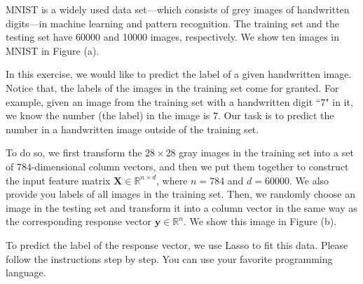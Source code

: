 \documentclass[11pt,letter,notitlepage]{article}
\begin{document}
\newpage
\begin{exercise}
    MNIST is a widely used data set---which consists of grey images of handwritten digits---in machine learning and pattern recognition. The training set and the testing set have 60000 and 10000 images, respectively. We show ten images in MNIST in Figure (a).
    
    In this exercise, we would like to predict the label of a given handwritten image. Notice that, the labels of the images in the training set come for granted. For example, given an image from the training set with a handwritten digit ``$7$" in it, we know the number (the label) in the image is $7$. Our task is to predict the number in a handwritten image outside of the training set.
    
    To do so, we first transform the $28\times28$ gray images in the training set into a set of $784$-dimensional column vectors, and then we put them together to construct the input feature matrix $\textbf{X} \in \mathbb{R}^{n\times d}$, where $n=784$ and $d=60000$. We also provide you labels of all images in the training set. Then, we randomly choose an image in the testing set and transform it into a column vector in the same way as the corresponding response vector $\textbf{y}\in \mathbb{R}^n$. We show this image in Figure (b).
    
    To predict the label of the response vector, we use Lasso to fit this data. Please follow the instructions step by step. You can use your favorite programming language.
\end{exercise}
    
 \begin{figure}[htp]
  \centering
  \hspace{1in}
  \label{fig:subfig} %
\end{figure} 
\end{document}
